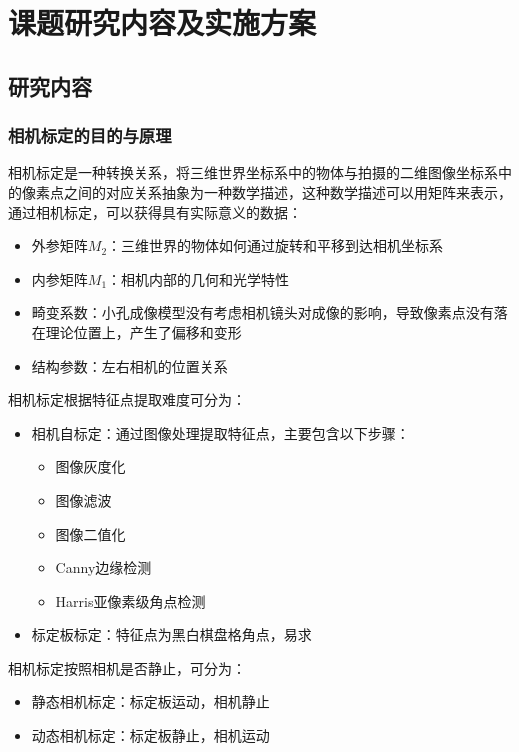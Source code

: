 \documentclass{article}
\begin{document}
\section{课题研究内容及实施方案}
\subsection{研究内容}
\subsubsection{相机标定的目的与原理}
相机标定是一种转换关系，将三维世界坐标系中的物体与拍摄的二维图像坐标系中的像素点之间的对应关系抽象为一种数学描述，这种数学描述可以用矩阵来表示，通过相机标定，可以获得具有实际意义的数据：
	\begin{itemize}
		\item 外参矩阵$M_2$：三维世界的物体如何通过旋转和平移到达相机坐标系
		\item 内参矩阵$M_1$：相机内部的几何和光学特性
		\item 畸变系数：小孔成像模型没有考虑相机镜头对成像的影响，导致像素点没有落在理论位置上，产生了偏移和变形
		\item 结构参数：左右相机的位置关系	
	\end{itemize}

相机标定根据特征点提取难度可分为：
	\begin{itemize}
		\item 相机自标定：通过图像处理提取特征点，主要包含以下步骤：
		\begin{itemize}
			\item 图像灰度化
			\item 图像滤波
			\item 图像二值化
			\item Canny边缘检测
			\item Harris亚像素级角点检测
		\end{itemize}
		\item 标定板标定：特征点为黑白棋盘格角点，易求
	\end{itemize}
相机标定按照相机是否静止，可分为：
\begin{itemize}
	\item 静态相机标定：标定板运动，相机静止
	\item 动态相机标定：标定板静止，相机运动
\end{itemize}
\end{document}
